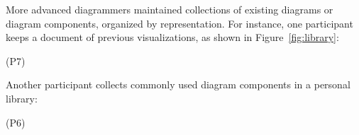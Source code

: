 More advanced diagrammers maintained collections of existing diagrams or diagram components, organized by representation. For instance, one participant keeps a document of previous visualizations, as shown in Figure~\ref{fig:library}: 

     (P7)

Another participant collects commonly used diagram components in a personal library:

     (P6)

    






